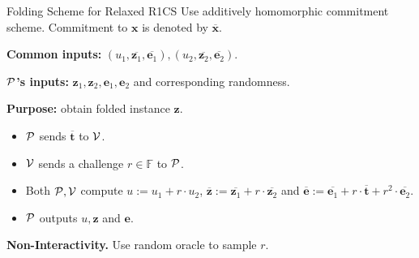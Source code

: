 \begin{frame}{Folding Scheme for Relaxed R1CS}
	Use additively homomorphic commitment scheme. Commitment to $\mathbf{x}$ is denoted by $\overline{\mathbf{x}}$.
	
	\textbf{Common inputs:} $(u_1,\overline{\mathbf{z}_1},\overline{\mathbf{e}_1}),(u_2, \overline{\mathbf{z}_2}, \overline{\mathbf{e}_2})$. 
	
	\textbf{$\mathcal{P}$'s inputs:} $\mathbf{z}_1, \mathbf{z}_2, \mathbf{e}_1, \mathbf{e}_2$ and corresponding randomness.
	
	\textbf{Purpose:} obtain folded instance $\mathbf{z}$.
	
	\begin{itemize}
		\item $\mathcal{P}$ sends $\overline{\mathbf{t}}$ to $\mathcal{V}$.
		\item $\mathcal{V}$ sends a challenge $r \in \mathbb{F}$ to $\mathcal{P}$.
		\item Both $\mathcal{P}, \mathcal{V}$ compute $u := u_1 + r\cdot u_2$, $\overline{\mathbf{z}} := \overline{\mathbf{z}_1} + r\cdot \overline{\mathbf{z}_2}$ and $\overline{\mathbf{e}} := \overline{\mathbf{e}_1} + r\cdot\overline{\mathbf{t}} + r^2\cdot \overline{\mathbf{e}_2}$.
		\item $\mathcal{P}$ outputs $u, \mathbf{z}$ and $\mathbf{e}$.
	\end{itemize}  

	\textbf{Non-Interactivity.} Use random oracle to sample $r$.
\end{frame}